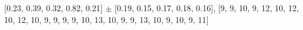 
[0.23, 0.39, 0.32, 0.82, 0.21] $\pm$ [0.19, 0.15, 0.17, 0.18, 0.16], [9, 9, 10, 9, 12, 10, 12, 10, 12, 10, 9, 9, 9, 9, 10, 13, 10, 9, 9, 13, 10, 9, 10, 9, 11]\\
